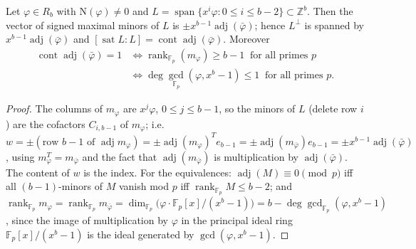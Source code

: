 \documentclass[12pt]{article}
\newcommand{\Z}{\mathbb{Z}}
\newcommand{\F}{\mathbb{F}}
\newcommand{\rank}{\operatorname{rank}}
\newcommand{\cont}{\operatorname{cont}}
\newcommand{\adj}{\operatorname{adj}}
\newcommand{\sat}{\operatorname{sat}}
\newcommand{\Nm}{\mathrm{N}}
\begin{document}
\begin{proposition}\label{prop:level}
Let $\varphi\in R_b$ with $\Nm(\varphi)\ne0$ and $L=\operatorname{span}\{x^i\varphi:0\le i\le b-2\}\subset\Z^b$. Then the
vector of signed maximal minors of $L$ is $\pm x^{b-1}\adj(\bar\varphi)$; hence $L^\perp$ is spanned by
$x^{b-1}\adj(\bar\varphi)$ and $[\sat L:L]=\cont\adj(\bar\varphi)$. Moreover
\begin{align*}
\cont\adj(\bar\varphi)=1&\iff \rank_{\F_p}(m_\varphi)\ge b-1\ \text{ for all primes }p\\
&\iff \deg\gcd_{\F_p}(\varphi,x^b-1)\le1\ \text{ for all primes }p .
\end{align*}
\end{proposition}
\begin{proof}
The columns of $m_\varphi$ are $x^j\varphi$, $0\le j\le b-1$, so the minors of $L$ (delete row $i$) are the cofactors
$C_{i,b-1}$ of $m_\varphi$; i.e.\ $w=\pm(\text{row }b-1\text{ of }\adj m_\varphi)=\pm\adj(m_\varphi)^{T}e_{b-1}
=\pm\adj(m_{\bar\varphi})e_{b-1}=\pm x^{b-1}\adj(\bar\varphi)$, using $m_\varphi^T=m_{\bar\varphi}$ and the fact that
$\adj(m_{\bar\varphi})$ is multiplication by $\adj(\bar\varphi)$. The content of $w$ is the index.
For the equivalences: $\adj(M)\equiv0\pmod p$ iff all $(b-1)$-minors of $M$ vanish mod $p$ iff $\rank_{\F_p}M\le b-2$;
and $\rank_{\F_p}m_\varphi=\rank_{\F_p}m_{\bar\varphi}=\dim_{\F_p}\bigl(\varphi\cdot\F_p[x]/(x^b-1)\bigr)=b-\deg\gcd_{\F_p}(\varphi,x^b-1)$,
since the image of multiplication by $\varphi$ in the principal ideal ring $\F_p[x]/(x^b-1)$ is the ideal generated by
$\gcd(\varphi,x^b-1)$.
\end{proof}
\end{document}
